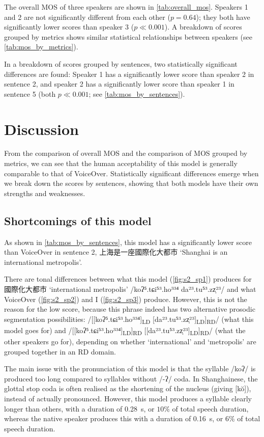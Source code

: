 \documentclass[11pt]{article}
\begin{document}
The overall MOS of three speakers are shown in \cref{tab:overall_mos}. Speakers 1 and 2 are not significantly different from each other ($p=0.64$); they both have significantly lower scores than speaker 3 ($p\ll 0.001$).
A breakdown of scores grouped by metrics shows similar statistical relationships between speakers (see \cref{tab:mos_by_metrics}).

In a breakdown of scores grouped by sentences, two statistically significant differences are found: Speaker 1 has a significantly lower score than speaker 2 in sentence 2, and speaker 2 has a significantly lower score than speaker 1 in sentence 5 (both $p\ll 0.001$; see \cref{tab:mos_by_sentences}).

\section{Discussion}
From the comparison of overall MOS and the comparison of MOS grouped by metrics, we can see that the human acceptability of this model is generally comparable to that of VoiceOver.
Statistically significant differences emerge when we break down the scores by sentences, showing that both models have their own strengths and weaknesses.

\subsection{Shortcomings of this model}
As shown in \cref{tab:mos_by_sentences}, this model has a significantly lower score than VoiceOver in sentence 2, 上海是一座國際化大都市 `Shanghai is an international metropolis'.

There are tonal differences between what this model (\cref{fig:s2_sp1}) produces for 國際化大都市 `international metropolis' /koʔ⁵.tɕi⁵³.ho³³⁴ da²³.tu⁵³.zz̩²³/ and what VoiceOver (\cref{fig:s2_sp2}) and I (\cref{fig:s2_sp3}) produce.
However, this is not the reason for the low score, because this phrase indeed has two alternative prosodic segmentation possibilities: /[[koʔ⁵.tɕi⁵³.ho³³⁴]\textsubscript{LD} [da²³.tu⁵³.zz̩²³]\textsubscript{LD}]\textsubscript{RD}/ (what this model goes for) and /[[koʔ⁵.tɕi⁵³.ho³³⁴]\textsubscript{LD}]\textsubscript{RD} [[da²³.tu⁵³.zz̩²³]\textsubscript{LD}]\textsubscript{RD}/ (what the other speakers go for), depending on whether `international' and `metropolis' are grouped together in an RD domain.

The main issue with the pronunciation of this model is that the syllable /koʔ/ is produced too long compared to syllables without /-ʔ/ coda. In Shanghainese, the glottal stop coda is often realised as the shortening of the nucleus (giving [kŏ]), instead of actually pronounced.
However, this model produces a syllable clearly longer than others, with a duration of \qty{0.28}{s}, or $10\%$ of total speech duration, whereas the native speaker produces this with a duration of \qty{0.16}{s}, or $6\%$ of total speech duration.
\end{document}
